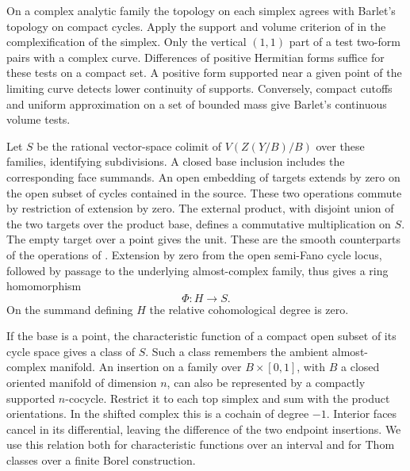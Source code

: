 On a complex analytic family the topology on each simplex agrees with
Barlet's topology on compact cycles. Apply the support and volume
criterion of \cite[\S1]{Barlet} in the complexification of the
simplex. Only the vertical $(1,1)$ part of a test two-form pairs with
a complex curve. Differences of positive Hermitian forms suffice for
these tests on a compact set. A positive form supported near a given
point of the limiting curve detects lower continuity of supports.
Conversely, compact cutoffs and uniform approximation on a set of
bounded mass give Barlet's continuous volume tests.

Let $S$ be the rational vector-space colimit of $V(Z(Y/B)/B)$ over
these families, identifying subdivisions. A closed base inclusion
includes the corresponding face summands. An open embedding of targets
extends by zero on the open subset of cycles contained in the source.
These two operations commute by restriction of extension by zero.
The external product, with disjoint union of the two targets over the
product base, defines a commutative multiplication on $S$. The empty
target over a point gives the unit. These are the smooth counterparts
of the operations of \cite[\S3.1]{Pardon}. Extension by zero from the
open semi-Fano cycle locus, followed by passage to the underlying
almost-complex family, thus gives a ring homomorphism
\[
                          \Phi:H\longrightarrow S .
\]
On the summand defining $H$ the relative cohomological degree is zero.

If the base is a point, the characteristic function of a compact open
subset of its cycle space gives a class of $S$. Such a class remembers
the ambient almost-complex manifold. An insertion on a family over
$B\times[0,1]$, with $B$ a closed oriented manifold of dimension $n$,
can also be represented by a compactly supported $n$-cocycle.
Restrict it to each top simplex and sum with the product orientations.
In the shifted complex this is a cochain of degree $-1$. Interior
faces cancel in its differential, leaving the difference of the two
endpoint insertions. We use this relation both for characteristic
functions over an interval and for Thom classes over a finite Borel
construction.

